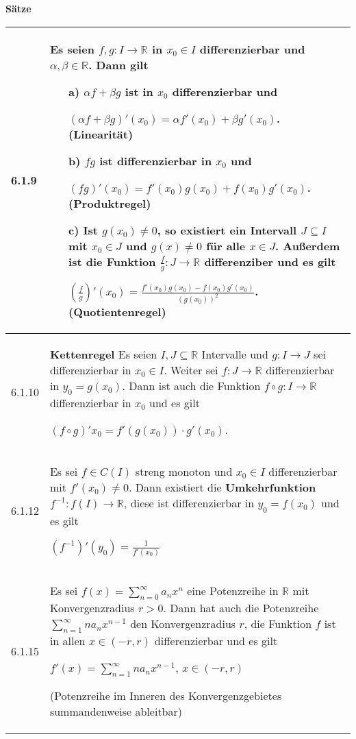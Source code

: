    \noindent 
    \textbf{Sätze}
    \begin{table}[H]
    \begin{tabularx}{\textwidth}{X m{16cm}}
        \toprule

        6.1.9 & Es seien $f,g: I \rightarrow \mathbb{R}$ in $x_0 \in I$ differenzierbar und $\alpha,\beta \in \mathbb{R}$. Dann gilt
                \begin{itemize}
                    \item[a)] $\alpha f +\beta g$ ist in $x_0$ differenzierbar und \hfill \break
                                \centerline{$(\alpha f + \beta g)'(x_0) = \alpha f'(x_0) + \beta g'(x_0)$. \textbf{(Linearität)}}
                    \item[b)] $fg$ ist differenzierbar in $x_0$ und \hfill \break
                                \centerline{$ (fg)'(x_0)=f'(x_0)g(x_0) + f(x_0)g'(x_0)$. (\textbf{Produktregel})}
                    \item[c)] Ist $g(x_0) \neq 0$, so existiert ein Intervall $J \subseteq I$ mit $x_0 \in J$ und $g(x) \neq 0$ für
                                alle $x \in J$. Außerdem ist die Funktion $\frac{f}{g}: J \rightarrow \mathbb{R}$ 
                                differenziber und es gilt \hfill \break
                                \centerline{$(\frac{f}{g})'(x_0)= \frac{f'(x_0)g(x_0)-f(x_0)g'(x_0)}{(g(x_0))^2}$. (\textbf{Quotientenregel})} 
                \end{itemize} \\
        \midrule
        6.1.10& \textbf{Kettenregel} \hfill \break
                Es seien $I, J \subseteq \mathbb{R}$ Intervalle und $g: I \rightarrow J$ sei differenzierbar in $x_0 \in I$.
                Weiter sei $f:J \rightarrow \mathbb{R}$ differenzierbar in $y_0 = g(x_0)$. Dann ist auch die Funktion
                $f \circ g: I \rightarrow \mathbb{R}$ differenzierbar in $x_0$ und es gilt \hfill \break
                \centerline{$(f\circ g)'x_0 = f'(g(x_0)) \cdot g'(x_0)$.} \\
        \midrule
        6.1.12& Es sei $f \in C(I)$ streng monoton und $x_0 \in I$ differenzierbar mit \textbf{$f'(x_0) \neq 0$}. Dann existiert die
                \textbf{Umkehrfunktion} $f^{-1}: f(I) \rightarrow \mathbb{R}$, diese ist differenzierbar in $y_0 = f(x_0)$ und es gilt \hfill \break
                \centerline{$(f^{-1})'(y_0) = \frac{1}{f'(x_0)} $} \\
        \midrule
        6.1.15& Es sei $f(x) = \sum^{\infty}_{n=0} a_n  x^n$ eine Potenzreihe in $\mathbb{R}$ mit Konvergenzradius $r >0$. Dann hat
                auch die Potenzreihe $\sum^{\infty}_{n=1} na_nx^{n-1}$ den Konvergenzradius $r$, die Funktion $f$ ist in allen
                $x \in (-r,r)$ differenzierbar und es gilt \hfill \break
                \centerline{$f'(x) = \sum^{\infty}_{n=1} na_n x^{n-1}$, $x \in (-r,r)$}
                (Potenzreihe im Inneren des Konvergenzgebietes summandenweise ableitbar)\\

        \bottomrule
    \end{tabularx}
    \end{table}

